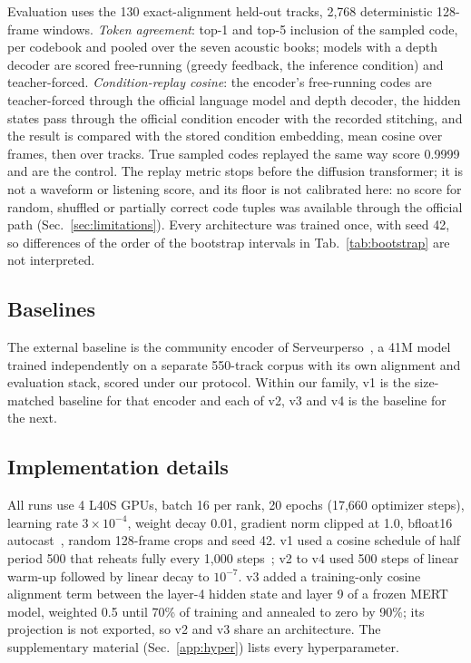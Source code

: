 Evaluation uses the 130 exact-alignment held-out tracks, 2,768 deterministic 128-frame windows. \emph{Token agreement}: top-1 and top-5 inclusion of the sampled code, per codebook and pooled over the seven acoustic books; models with a depth decoder are scored free-running (greedy feedback, the inference condition) and teacher-forced. \emph{Condition-replay cosine}: the encoder's free-running codes are teacher-forced through the official language model and depth decoder, the hidden states pass through the official condition encoder with the recorded stitching, and the result is compared with the stored condition embedding, mean cosine over frames, then over tracks. True sampled codes replayed the same way score 0.9999 and are the control. The replay metric stops before the diffusion transformer; it is not a waveform or listening score, and its floor is not calibrated here: no score for random, shuffled or partially correct code tuples was available through the official path (Sec.~\ref{sec:limitations}). Every architecture was trained once, with seed 42, so differences of the order of the bootstrap intervals in Tab.~\ref{tab:bootstrap} are not interpreted.

\subsection{Baselines}

The external baseline is the community encoder of Serveurperso~\cite{serveurperso2026encoder}, a 41M model trained independently on a separate 550-track corpus with its own alignment and evaluation stack, scored under our protocol. Within our family, v1 is the size-matched baseline for that encoder and each of v2, v3 and v4 is the baseline for the next.

\subsection{Implementation details}

All runs use 4 L40S GPUs, batch 16 per rank, 20 epochs (17,660 optimizer steps), learning rate $3\times 10^{-4}$, weight decay 0.01, gradient norm clipped at 1.0, bfloat16 autocast~\cite{micikevicius2018mixed}, random 128-frame crops and seed 42. v1 used a cosine schedule of half period 500 that reheats fully every 1,000 steps~\cite{loshchilov2017sgdr}; v2 to v4 used 500 steps of linear warm-up followed by linear decay to $10^{-7}$. v3 added a training-only cosine alignment term between the layer-4 hidden state and layer 9 of a frozen MERT~\cite{li2024mert} model, weighted 0.5 until 70\% of training and annealed to zero by 90\%; its projection is not exported, so v2 and v3 share an architecture. The supplementary material (Sec.~\ref{app:hyper}) lists every hyperparameter.
